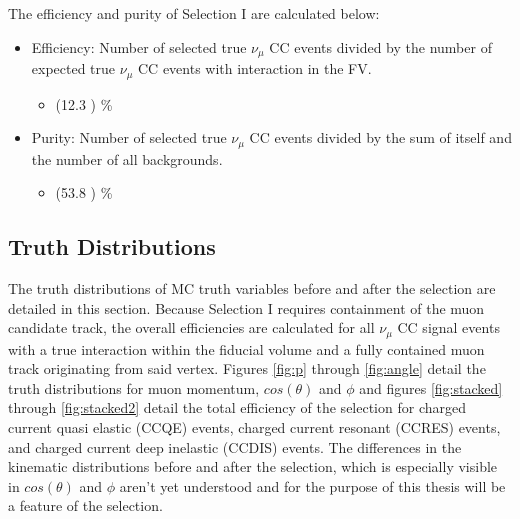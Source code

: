 The efficiency and purity of Selection I are calculated below:
\begin{itemize}
\item Efficiency: Number of selected true $\nu_{\mu}$ CC events divided by the number of expected true $\nu_{\mu}$ CC events with interaction in the FV.
	\begin{itemize}
	\item (12.3 ) \%
	\end{itemize}
\item Purity: Number of selected true $\nu_{\mu}$ CC events divided by the sum of itself and the number of all backgrounds.
	\begin{itemize}
	\item (53.8 ) \%
	\end{itemize}
\end{itemize}
\subsection{Truth Distributions}
The truth distributions of MC truth variables before and after the selection are detailed in this section. Because Selection I requires containment of the muon candidate track, the overall efficiencies are calculated for all $\nu_{\mu}$ CC signal events with a true interaction within the fiducial volume and a fully contained muon track originating from said vertex. Figures \ref{fig:p} through \ref{fig:angle} detail the truth distributions for muon momentum, $cos(\theta)$ and $\phi$ and figures \ref{fig:stacked} through \ref{fig:stacked2} detail the total efficiency of the selection for charged current quasi elastic (CCQE) events, charged current resonant (CCRES) events, and charged current deep inelastic (CCDIS) events. The differences in the kinematic distributions before and after the selection, which is especially visible in $cos(\theta)$ and $\phi$ aren't yet understood and for the purpose of this thesis will be a feature of the selection. 

